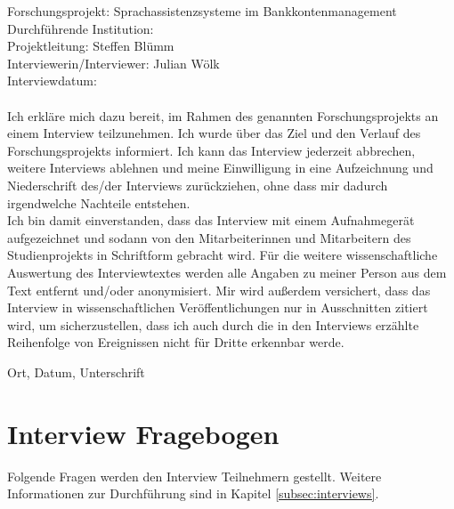 Forschungsprojekt: Sprachassistenzsysteme im Bankkontenmanagement\\
Durchführende Institution: \adorsys \\
Projektleitung: Steffen Blümm\\
Interviewerin/Interviewer: Julian Wölk\\
Interviewdatum:\\\\
Ich erkläre mich dazu bereit, im Rahmen des genannten Forschungsprojekts an einem Interview teilzunehmen. Ich wurde über das Ziel und den Verlauf des Forschungsprojekts informiert. Ich kann das Interview jederzeit abbrechen, weitere Interviews ablehnen und meine Einwilligung in eine Aufzeichnung und Niederschrift des/der Interviews zurückziehen, ohne dass mir dadurch irgendwelche Nachteile entstehen.\\
Ich bin damit einverstanden, dass das Interview mit einem Aufnahmegerät aufgezeichnet und sodann von den Mitarbeiterinnen und Mitarbeitern des Studienprojekts in Schriftform gebracht wird. Für die weitere wissenschaftliche Auswertung des Interviewtextes werden alle Angaben zu meiner Person aus dem Text entfernt und/oder anonymisiert. Mir wird außerdem versichert, dass das Interview in wissenschaftlichen Veröffentlichungen nur in Ausschnitten zitiert wird, um sicherzustellen, dass ich auch durch die in den Interviews erzählte Reihenfolge von Ereignissen nicht für Dritte erkennbar werde.

\vspace{3cm}

Ort, Datum, Unterschrift


\section{Interview Fragebogen}
\label{sec:ausfuehrung-interview-fragebogen}
Folgende Fragen werden den Interview Teilnehmern gestellt. Weitere Informationen zur Durchführung sind in Kapitel \ref{subsec:interviews}.


